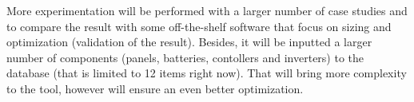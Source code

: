 \documentclass[10pt,conference]{IEEEtran}
\begin{document}
More experimentation will be performed with a larger number of case studies and to compare the result with some off-the-shelf software that focus on sizing and optimization (validation of the result). Besides, it will be inputted a larger number of components (panels, batteries, contollers and inverters) to the database (that is limited to 12 items right now). That will bring more complexity to the tool, however will ensure an even better optimization.
{}

\vspace{12pt}
\end{document}
